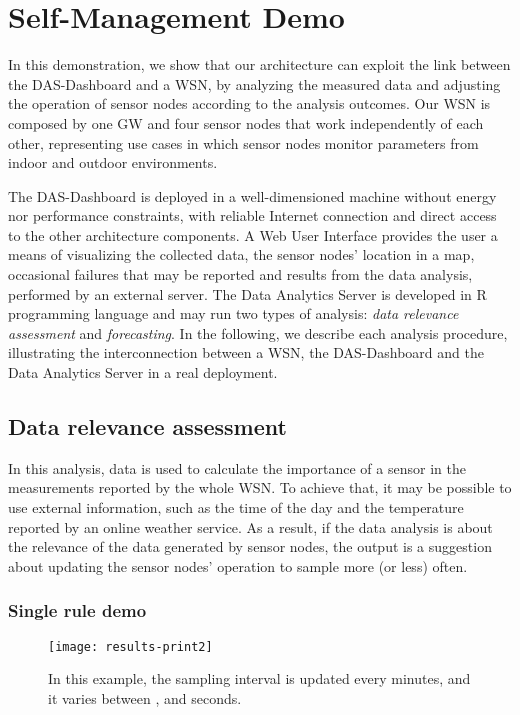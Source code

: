 \documentclass[conference, letterpaper]{IEEEtran}
\newcommand{\dashboard}[1]{DAS-Dashboard}
\newcommand{\gateway}[1]{GW#1}
\begin{document}
\section{Self-Management Demo}

In this demonstration, we show that our architecture can exploit the link between the \dashboard{} and a WSN, by analyzing the measured data and adjusting the operation of sensor nodes according to the analysis outcomes. Our WSN is composed by one \gateway{} and four sensor nodes that work independently of each other, representing use cases in which sensor nodes monitor parameters from indoor and outdoor environments.

The \dashboard{} is deployed in a well-dimensioned machine without energy nor performance constraints, with reliable Internet connection and direct access to the other architecture components. A Web User Interface provides the user a means of visualizing the collected data, the sensor nodes' location in a map, occasional failures that may be reported and results from the data analysis, performed by an external server. The Data Analytics Server is developed in R programming language and may run two types of analysis: \emph{data relevance assessment} and \emph{forecasting}. In the following, we describe each analysis procedure, illustrating the interconnection between a WSN, the \dashboard{} and the Data Analytics Server in a real deployment.

\subsection{Data relevance assessment}

In this analysis, data is used to calculate the importance of a sensor in the measurements reported by the whole WSN. To achieve that, it may be possible to use external information, such as the time of the day and the temperature reported by an online weather service. As a result, if the data analysis is about the relevance of the data generated by sensor nodes, the output is a suggestion about updating the sensor nodes' operation to sample more (or less) often.

\subsubsection{Single rule demo}

\begin{figure}[t]
	\centering
\texttt{[image: results-print2]}
	\caption{In this example, the sampling interval is updated every  minutes, and it varies between ,  and  seconds.}
	\label{fig:adaptive-sampling}
\end{figure}
\end{document}
